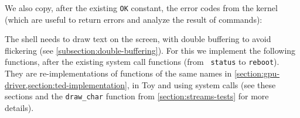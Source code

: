 

We also copy, after the existing {\tt OK} constant, the error codes from the
kernel (which are useful to return errors and analyze the result of commands):


The shell needs to draw text on the screen, with double buffering to avoid
flickering (see \cref{subsection:double-buffering}). For this we implement the
following functions, after the existing system call functions (from {\tt
status} to {\tt reboot}). They are re-implementations of functions of the same
names in \cref{section:gpu-driver,section:ted-implementation}, in Toy and using
system calls (see these sections and the {\tt draw\_char} function from
\cref{section:streams-tests} for more details).


